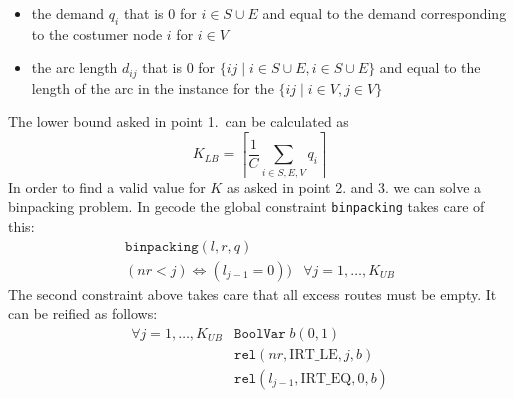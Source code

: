 \begin{solution}
\begin{itemize}
\item the demand $q_i$ that is $0$ for $i\in S\cup E$ and equal to the demand
  corresponding to the costumer node $i$ for $i\in V$ 
\item the arc length $d_{ij}$ that is $0$ for $\{ij \mid i\in S\cup E, i
  \in S\cup E\}$ and equal to the length of the arc in the instance for
  the $\{ij \mid i\in V,j\in V\}$

\end{itemize}

The lower bound asked in point 1.~can be calculated as 
\[
K_{LB}=\left\lceil \frac{1}{C}\sum_{i\in S,E,V} q_i \right\rceil
\]
In order to find a valid value for $K$ as asked in point 2. and 3. we
can solve a binpacking problem. In gecode the global constraint
\verb=binpacking= takes care of this:
\begin{eqnarray}
\texttt{binpacking}(l, r, q)\\
(nr < j) \iff (l_{j - 1} = 0)) & \forall j = 1,\ldots,K_{UB}
\end{eqnarray}
The second constraint above takes care that all excess routes must be
empty. It can be reified as follows: 
\begin{eqnarray}
 \forall j = 1,\ldots,K_{UB} &  \texttt{BoolVar}\; b(0, 1)\\
&  \texttt{rel}( nr, \mbox{IRT\_LE}, j, b)\\
&  \texttt{rel}(l_{j - 1}, \mbox{IRT\_EQ}, 0, b)
\end{eqnarray}

\end{solution}
